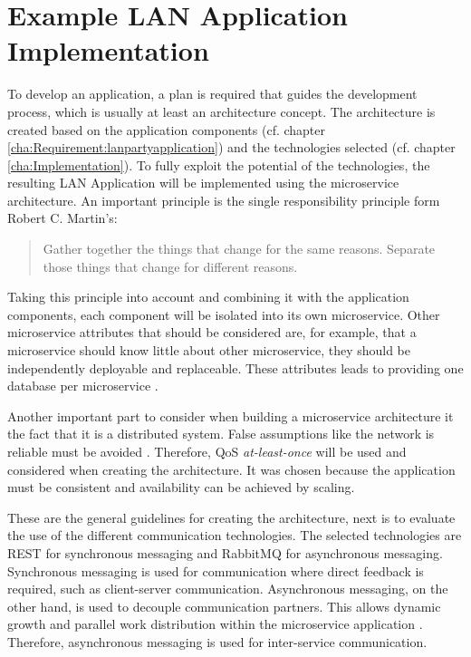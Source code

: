 
\chapter{Example LAN Application Implementation}\label{cha:ExampleLAN}

To develop an application, a plan is required that guides the development process, which is usually at least an architecture concept.
The architecture is created based on the application components (cf. chapter \ref{cha:Requirement:lanpartyapplication}) and the technologies selected (cf. chapter \ref{cha:Implementation}).
To fully exploit the potential of the technologies, the resulting \ac{LAN} Application will be implemented using the microservice architecture.
An important principle is the single responsibility principle form Robert C. Martin’s: \cite[p.~4]{Bruce.2019}

\begin{quote}
	Gather together the things that change for the same reasons. Separate those things that
	change for different reasons.
\end{quote}

Taking this principle into account and combining it with the application components, each component will be isolated into its own microservice.
Other microservice attributes that should be considered are, for example, that a microservice should know little about other microservice, they should be independently deployable and replaceable.
These attributes leads to providing one database per microservice \cite[p.~4ff.]{Bruce.2019}.

Another important part to consider when building a microservice architecture it the fact that it is a distributed system.
False assumptions like the network is reliable must be avoided \cite[p.~16]{Bruce.2019}.
Therefore, \ac{QoS} \textit{at-least-once} will be used and considered when creating the architecture.
It was chosen because the application must be consistent and availability can be achieved by scaling.

These are the general guidelines for creating the architecture, next is to evaluate the use of the different communication technologies.
The selected technologies are \ac{REST} for synchronous messaging and RabbitMQ for asynchronous messaging.
Synchronous messaging is used for communication where direct feedback is required, such as client-server communication.
Asynchronous messaging, on the other hand, is used to decouple communication partners.
This allows dynamic growth and parallel work distribution within the microservice application \cite[p.~62f.]{Bruce.2019}.
Therefore, asynchronous messaging is used for inter-service communication.

